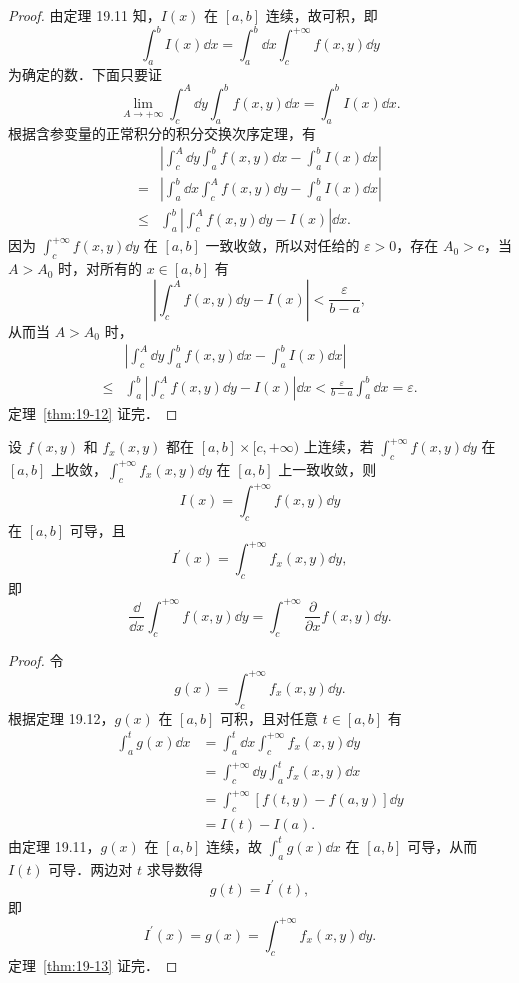 \begin{proof}
由定理 19.11 知，$I(x)$ 在 $[a,b]$ 连续，故可积，即
\[
\int_{a}^{b}I(x)\dd x=\int_{a}^{b}\dd x\int_{c}^{+\infty}f(x,y)\dd y
\]
为确定的数．下面只要证
\[
\lim_{A\to+\infty}\int_{c}^{A}\dd y\int_{a}^{b}f(x,y)\dd x=\int_{a}^{b}I(x)\dd x.
\]
根据含参变量的正常积分的积分交换次序定理，有
\[
\begin{aligned}
&\left|\int_{c}^{A}\dd y\int_{a}^{b}f(x,y)\dd x-\int_{a}^{b}I(x)\dd x\right|\\
={}&\left|\int_{a}^{b}\dd x\int_{c}^{A}f(x,y)\dd y-\int_{a}^{b}I(x)\dd x\right|\\
\leqslant{}&\int_{a}^{b}\left|\int_{c}^{A}f(x,y)\dd y-I(x)\right|\dd x.
\end{aligned}
\]
因为 $\displaystyle\int_{c}^{+\infty}f(x,y)\dd y$ 在 $[a,b]$ 一致收敛，所以对任给的 $\varepsilon>0$，存在 $A_{0}>c$，当 $A>A_{0}$ 时，对所有的 $x\in[a,b]$ 有
\[
\left|\int_{c}^{A}f(x,y)\dd y-I(x)\right|<\frac{\varepsilon}{b-a},
\]
从而当 $A>A_{0}$ 时，
\[
\begin{aligned}
&\left|\int_{c}^{A}\dd y\int_{a}^{b}f(x,y)\dd x-\int_{a}^{b}I(x)\dd x\right|\\
\leqslant{}&\int_{a}^{b}\left|\int_{c}^{A}f(x,y)\dd y-I(x)\right|\dd x<\frac{\varepsilon}{b-a}\int_{a}^{b}\dd x=\varepsilon.
\end{aligned}
\]
定理~\ref{thm:19-12} 证完．
\end{proof}

\begin{theorem}[积分号下求导数]\label{thm:19-13}
设 $f(x,y)$ 和 $f_{x}(x,y)$ 都在 $[a,b]\times[c,+\infty)$ 上连续，若 $\displaystyle\int_{c}^{+\infty}f(x,y)\dd y$ 在 $[a,b]$ 上收敛，$\displaystyle\int_{c}^{+\infty}f_{x}(x,y)\dd y$ 在 $[a,b]$ 上一致收敛，则
\[
I(x)=\int_{c}^{+\infty}f(x,y)\dd y
\]
在 $[a,b]$ 可导，且
\[
I^{\prime}(x)=\int_{c}^{+\infty}f_{x}(x,y)\dd y,
\]
即
\[
\frac{\dd}{\dd x}\int_{c}^{+\infty}f(x,y)\dd y=\int_{c}^{+\infty}\frac{\partial}{\partial x}f(x,y)\dd y.
\]
\end{theorem}

\begin{proof}
令
\[
g(x)=\int_{c}^{+\infty}f_{x}(x,y)\dd y.
\]
根据定理 19.12，$g(x)$ 在 $[a,b]$ 可积，且对任意 $t\in[a,b]$ 有
\[
\begin{aligned}
\int_{a}^{t}g(x)\dd x&=\int_{a}^{t}\dd x\int_{c}^{+\infty}f_{x}(x,y)\dd y\\
&=\int_{c}^{+\infty}\dd y\int_{a}^{t}f_{x}(x,y)\dd x\\
&=\int_{c}^{+\infty}\left[f(t,y)-f(a,y)\right]\dd y\\
&=I(t)-I(a).
\end{aligned}
\]
由定理 19.11，$g(x)$ 在 $[a,b]$ 连续，故 $\displaystyle\int_{a}^{t}g(x)\dd x$ 在 $[a,b]$ 可导，从而 $I(t)$ 可导．两边对 $t$ 求导数得
\[
g(t)=I^{\prime}(t),
\]
即
\[
I^{\prime}(x)=g(x)=\int_{c}^{+\infty}f_{x}(x,y)\dd y.
\]
定理~\ref{thm:19-13} 证完．
\end{proof}

